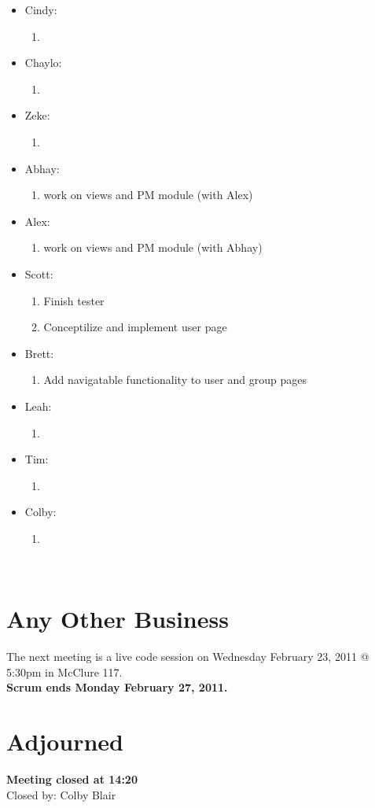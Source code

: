 \documentclass[12pt]{article}
\begin{document}
\begin{itemize}
\item Cindy:
\begin{enumerate}
	\item
\end{enumerate}
\item Chaylo:
\begin{enumerate}
	\item
\end{enumerate}
\item Zeke:
\begin{enumerate}
	\item
\end{enumerate}
\item Abhay:
\begin{enumerate}
	\item work on views and PM module (with Alex)
\end{enumerate}
\item Alex:
\begin{enumerate}
	\item work on views and PM module (with Abhay)
\end{enumerate}
\item Scott:
\begin{enumerate}
	\item Finish tester
	\item Conceptilize and implement user page
\end{enumerate}
\item Brett:
\begin{enumerate}
	\item Add navigatable functionality to user and group pages
\end{enumerate}
\item Leah:
\begin{enumerate}
	\item
\end{enumerate}
\item Tim:
\begin{enumerate}
	\item
\end{enumerate}
\item Colby:
\begin{enumerate}
	\item
\end{enumerate}
\end{itemize}
\\  
\section{Any Other Business}
The next meeting is a live code session on Wednesday February 23, 2011 @ 5:30pm in McClure 117. \\
\textbf{Scrum ends Monday February 27, 2011.}
\\
\section{Adjourned}
\textbf{Meeting closed at 14:20} \\
Closed by: Colby Blair \\
\end{document}
